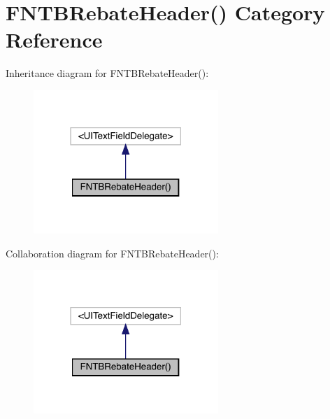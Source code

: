 \hypertarget{category_f_n_t_b_rebate_header_07_08}{}\section{F\+N\+T\+B\+Rebate\+Header() Category Reference}
\label{category_f_n_t_b_rebate_header_07_08}


Inheritance diagram for F\+N\+T\+B\+Rebate\+Header()\+:\nopagebreak
\begin{figure}[H]
\begin{center}
\leavevmode
\includegraphics[width=198pt]{category_f_n_t_b_rebate_header_07_08__inherit__graph}
\end{center}
\end{figure}


Collaboration diagram for F\+N\+T\+B\+Rebate\+Header()\+:\nopagebreak
\begin{figure}[H]
\begin{center}
\leavevmode
\includegraphics[width=198pt]{category_f_n_t_b_rebate_header_07_08__coll__graph}
\end{center}
\end{figure}
